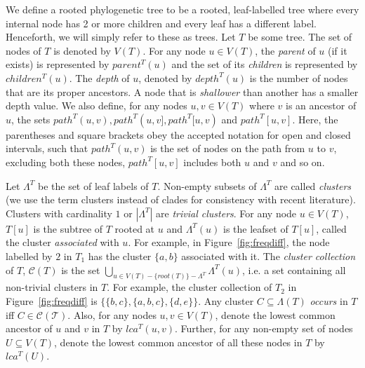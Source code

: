 \documentclass[12pt,a4paper]{article}
\newcommand{\leafset}{\Lambda}
\begin{document}
    We define a rooted phylogenetic tree to be a rooted, leaf-labelled tree where every internal node has 2 or more children and every leaf has a different label. Henceforth, we will simply refer to these as trees. Let $T$ be some tree. The set of nodes of $T$ is denoted by $V(T)$. For any node $u \in V(T)$, the \textit{parent} of $u$ (if it exists) is represented by $parent^T(u)$ and the set of its \textit{children} is represented by $children^T(u)$. The \textit{depth} of $u$, denoted by $depth^T(u)$ is the number of nodes that are its proper ancestors. A node that is \textit{shallower} than another has a smaller depth value. We also define, for any nodes $u, v \in V(T)$ where $v$ is an ancestor of $u$, the sets $path^T(u, v), path^T(u, v], path^T[u, v)$ and $path^T[u, v]$. Here, the parentheses and square brackets obey the accepted notation for open and closed intervals, such that $path^T(u, v)$ is the set of nodes on the path from $u$ to $v$, excluding both these nodes, $path^T[u, v]$ includes both $u$ and $v$ and so on.

    Let $\leafset^T$ be the set of leaf labels of $T$. Non-empty subsets of $\leafset^T$ are called \textit{clusters} (we use the term clusters instead of clades for consistency with recent literature). Clusters with cardinality $1$ or $|\leafset^T|$ are \textit{trivial clusters}. For any node $u \in V(T)$, $T[u]$ is the subtree of $T$ rooted at $u$ and $\leafset^T(u)$ is the leafset of $T[u]$, called the cluster \textit{associated} with $u$. For example, in Figure~\ref{fig:freqdiff}, the node labelled by $2$ in $T_1$ has the cluster $\{a, b\}$ associated with it. The \textit{cluster collection} of $T$, $\mathcal{C}(T)$ is the set $\bigcup_{u \in V(T) - \{root(T)\} - \leafset^T} {\leafset^T(u)}$, i.e. a set containing all non-trivial clusters in $T$. For example, the cluster collection of $T_2$ in Figure~\ref{fig:freqdiff} is $\{\{b, c\}, \{a, b, c\}, \{d, e\}\}$. Any cluster $C \subseteq \leafset(T)$ \textit{occurs} in $T$ iff $C \in \mathcal{C(T)}$. Also, for any nodes $u, v \in V(T)$, denote the lowest common ancestor of $u$ and $v$ in $T$ by $lca^T(u, v)$. Further, for any non-empty set of nodes $U \subseteq V(T)$, denote the lowest common ancestor of all these nodes in $T$ by $lca^T(U)$.
\end{document}

